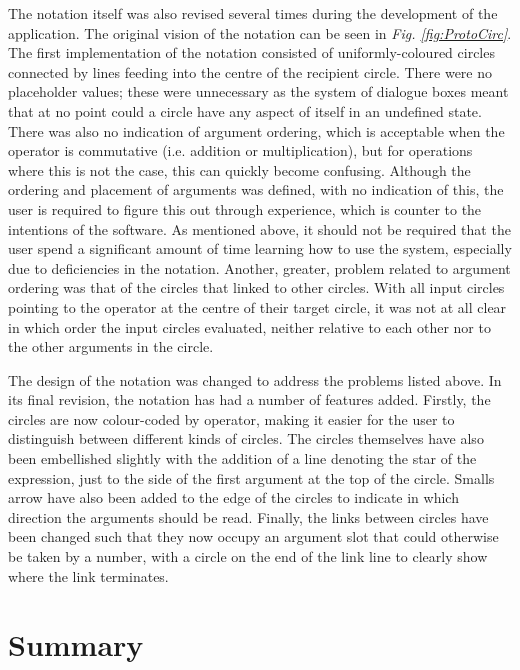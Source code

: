 \documentclass[12pt,twoside,notitlepage,xetex]{report}
\begin{document}
The notation itself was also revised several times during the development of
the application.  The original vision of the notation can be seen in
\emph{Fig. \ref{fig:ProtoCirc}}.  The first implementation of the notation consisted of
uniformly-coloured circles connected by lines feeding into the centre of the
recipient circle.  There were no placeholder values; these were unnecessary as
the system of dialogue boxes meant that at no point could a circle have any
aspect of itself in an undefined state.  There was also no indication of
argument ordering, which is acceptable when the operator is commutative (i.e.
addition or multiplication), but for operations where this is not the case,
this can quickly become confusing.  Although the ordering and placement of
arguments was defined, with no indication of this, the user is required to
figure this out through experience, which is counter to the intentions of the
software.  As mentioned above, it should not be required that the user spend a
significant amount of time learning how to use the system, especially due to
deficiencies in the notation.  Another, greater, problem related to argument
ordering was that of the circles that linked to other circles.  With all input
circles pointing to the operator at the centre of their target circle, it was
not at all clear in which order the input circles evaluated, neither relative
to each other nor to the other arguments in the circle.

The design of the notation was changed to address the problems listed above.  In its
final revision, the notation has had a number of features added.  Firstly,
the circles are now colour-coded by operator, making it easier for the user to
distinguish between different kinds of circles.  The circles themselves have
also been embellished slightly with the addition of a line denoting the star of
the expression, just to the side of the first argument at the top of the
circle.  Smalls arrow have also been added to the edge of the circles to
indicate in which direction the arguments should be read.  Finally, the links
between circles have been changed such that they now occupy an argument slot
that could otherwise be taken by a number, with a circle on the end of the link
line to clearly show where the link terminates.


\section{Summary}
\end{document}
